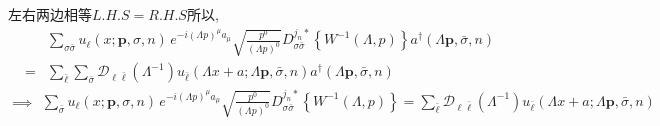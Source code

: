 左右两边相等$L.H.S=R.H.S$所以,
\[    \begin{aligned}
    &\sum_{\sigma\bar{\sigma}}u_{\ell}(x;\boldsymbol{p},\sigma,n)\,e^{-i(\Lambda p)^\mu a_\mu}\sqrt{\frac{p^0}{(\Lambda p)^0}}
    D_{\sigma \bar{\sigma}}^{j_n*}\left\{W^{-1}(\Lambda,p)\right\}a^\dagger(\Lambda\boldsymbol{p},\bar{\sigma},n)
    \\=&\sum_{\bar{\ell}}\sum_{\bar{\sigma}}\mathscr{D}_{\ell\bar{\ell}}(\Lambda^{-1})u_{\bar{\ell}}(\Lambda x+a;\Lambda \boldsymbol{p},\bar{\sigma},n) a^\dagger(\Lambda \boldsymbol{p},\bar{\sigma},n)
\end{aligned}\]
\[\implies
    \begin{aligned}
            \sum_{\bar{\sigma}}u_{\ell}(x;\boldsymbol{p},\sigma,n)\,e^{-i(\Lambda p)^\mu a_\mu}\sqrt{\frac{p^0}{(\Lambda p)^0}}D_{\sigma \bar{\sigma}}^{j_n*}\left\{W^{-1}(\Lambda,p)\right\}=\sum_{\bar{\ell}}\mathscr{D}_{\ell\bar{\ell}}(\Lambda^{-1})u_{\bar{\ell}}(\Lambda x+a;\Lambda \boldsymbol{p},\bar{\sigma},n)
    \end{aligned}\]

